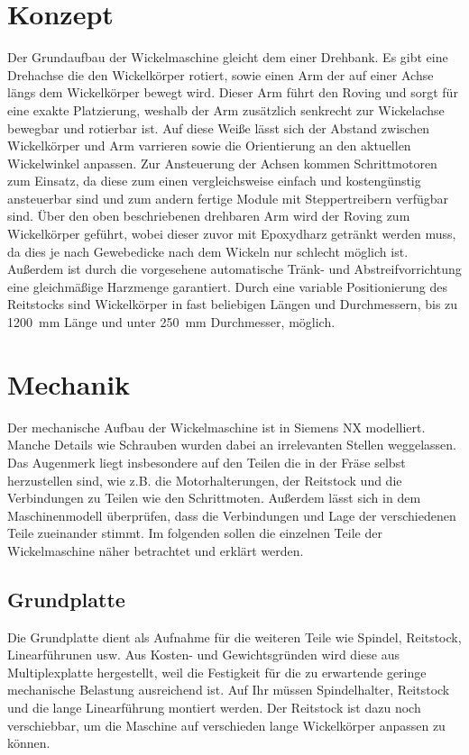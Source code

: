 \documentclass[paper=A4,pagesize,DIV=18, 12pt,listof=totoc,bibliography=totoc,headings=optiontohead,open=any]{article}
\begin{document}
\section{Konzept}
Der Grundaufbau der Wickelmaschine gleicht dem einer Drehbank. Es gibt eine Drehachse die den Wickelkörper rotiert, sowie einen Arm der auf einer Achse längs dem Wickelkörper bewegt wird. Dieser Arm führt den Roving und sorgt für eine exakte Platzierung, weshalb der Arm zusätzlich senkrecht zur Wickelachse bewegbar und rotierbar ist. Auf diese Weiße lässt sich der Abstand zwischen Wickelkörper und Arm varrieren sowie die Orientierung an den aktuellen Wickelwinkel anpassen. Zur Ansteuerung der Achsen kommen Schrittmotoren zum Einsatz, da diese zum einen vergleichsweise einfach und kostengünstig ansteuerbar sind und zum andern fertige Module mit Steppertreibern verfügbar sind. Über den oben beschriebenen drehbaren Arm wird der Roving zum Wickelkörper geführt, wobei dieser zuvor mit Epoxydharz getränkt werden muss, da dies je nach Gewebedicke nach dem Wickeln nur schlecht möglich ist. Außerdem ist durch die vorgesehene automatische Tränk- und Abstreifvorrichtung eine gleichmäßige Harzmenge garantiert. Durch eine variable Positionierung des Reitstocks sind Wickelkörper in fast beliebigen Längen und Durchmessern, bis zu \SI{1200}{\milli\metre} Länge und unter \SI{250}{\milli\metre} Durchmesser, möglich.

\section{Mechanik}
Der mechanische Aufbau der Wickelmaschine ist in Siemens NX modelliert. Manche Details wie Schrauben wurden dabei an irrelevanten Stellen weggelassen. Das Augenmerk liegt insbesondere auf den Teilen die in der Fräse selbst herzustellen sind, wie z.B. die Motorhalterungen, der Reitstock und die Verbindungen zu Teilen wie den Schrittmoten. Außerdem lässt sich in dem Maschinenmodell überprüfen, dass die Verbindungen und Lage der verschiedenen Teile zueinander stimmt. Im folgenden sollen die einzelnen Teile der Wickelmaschine näher betrachtet und erklärt werden.

\subsection{Grundplatte}
Die Grundplatte dient als Aufnahme für die weiteren Teile wie Spindel, Reitstock, Linearführunen usw. Aus Kosten- und Gewichtsgründen wird diese aus Multiplexplatte hergestellt, weil die Festigkeit für die zu erwartende geringe mechanische Belastung ausreichend ist. Auf Ihr müssen Spindelhalter, Reitstock und die lange Linearführung montiert werden. Der Reitstock ist dazu noch verschiebbar, um die Maschine auf verschieden lange Wickelkörper anpassen zu können.
\end{document}
